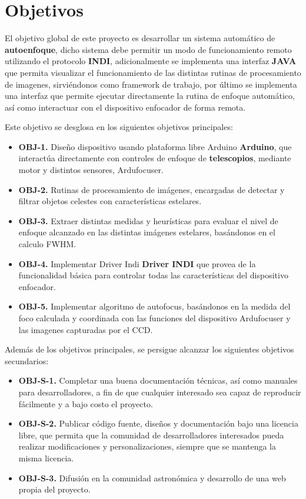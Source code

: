 \chapter{Objetivos}

El objetivo global de este proyecto es desarrollar un sistema automático de \textbf{autoenfoque}, dicho sistema debe permitir un modo de funcionamiento remoto utilizando el protocolo \textbf{INDI},
adicionalmente se implementa una interfaz  \textbf{JAVA} que permita visualizar el funcionamiento de las distintas rutinas de procesamiento de imagenes,
sirviéndonos como framework de trabajo, por último se implementa una interfaz que permite ejecutar directamente la rutina de enfoque automático,
así como interactuar con el dispositivo enfocador de forma remota.


\bigskip
Este objetivo se desglosa en los siguientes objetivos principales:

\begin{itemize}
  \item \textbf{OBJ-1.} Diseño dispositivo usando plataforma libre Arduino  \textbf{Arduino}, que interactúa directamente con controles de enfoque de \textbf{telescopios}, mediante motor y distintos sensores, Ardufocuser.
  \item \textbf{OBJ-2.} Rutinas de procesamiento de imágenes, encargadas de detectar y filtrar objetos celestes con características estelares.
  \item \textbf{OBJ-3.} Extraer distintas medidas y heurísticas para evaluar el nivel de enfoque alcanzado en las distintas imágenes estelares, basándonos en el calculo FWHM.
  \item \textbf{OBJ-4.} Implementar Driver Indi \textbf{Driver INDI} que provea de la funcionalidad básica para controlar todas las características del dispositivo enfocador.
  \item \textbf{OBJ-5.} Implementar algoritmo de autofocus, basándonos en la medida del foco calculada y coordinada con las funciones del dispositivo Ardufocuser y las imagenes capturadas por el CCD.
\end{itemize}

\bigskip
Además de los objetivos principales, se persigue alcanzar los siguientes objetivos secundarios:

\begin{itemize}
  \item \textbf{OBJ-S-1.} Completar una buena documentación técnicas, así como manuales para desarrolladores, a fin de que cualquier interesado sea capaz de reproducir fácilmente y a bajo costo el proyecto.
  \item \textbf{OBJ-S-2.} Publicar código fuente, diseños y documentación bajo una licencia libre, que permita que la comunidad de desarrolladores interesados pueda realizar modificaciones y personalizaciones, siempre que se mantenga la misma licencia.
  \item \textbf{OBJ-S-3.} Difusión en la comunidad astronómica y desarrollo de una web propia del proyecto.

\end{itemize}

